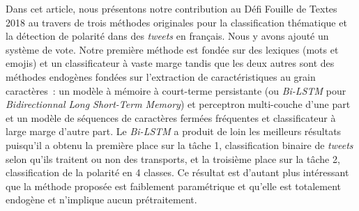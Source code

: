 
 Dans cet article, nous présentons notre contribution au Défi Fouille de Textes 2018 au travers de trois méthodes originales pour la classification thématique et la détection de polarité dans des \textit{tweets} en français. Nous y avons ajouté un système de vote.
 Notre première méthode est fondée sur des lexiques (mots et emojis) et un classificateur à vaste marge
 tandis que les deux autres sont des méthodes endogènes fondées sur l'extraction de caractéristiques au grain caractères~: un modèle à mémoire à court-terme persistante (ou \textit{Bi-LSTM} pour \textit{Bidirectionnal Long Short-Term Memory}) et perceptron multi-couche d'une part et un modèle de séquences de caractères fermées fréquentes et classificateur à large marge d'autre part.
 Le \textit{Bi-LSTM} a produit de loin les meilleurs résultats puisqu'il a obtenu la première place sur la tâche 1, classification binaire de \textit{tweets} selon qu'ils traitent ou non des transports, et la troisième place sur la tâche 2, classification de la polarité en 4 classes.
 Ce résultat est d'autant plus intéressant que la méthode proposée est faiblement paramétrique et qu'elle est totalement endogène et n'implique aucun prétraitement.

